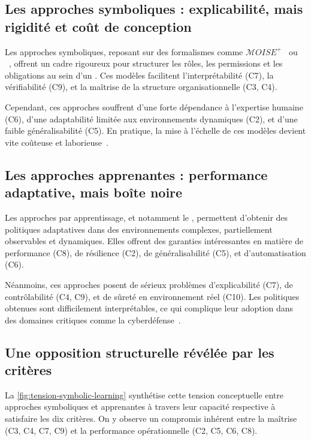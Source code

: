 \subsection{Les approches symboliques : explicabilité, mais rigidité et coût de conception}

Les approches symboliques, reposant sur des formalismes comme $\mathcal{M}OISE^+$~\cite{hubner2002moise} ou ~\cite{Ferber2004}, offrent un cadre rigoureux pour structurer les rôles, les permissions et les obligations au sein d'un . Ces modèles facilitent l'interprétabilité (C7), la vérifiabilité (C9), et la maîtrise de la structure organisationnelle (C3, C4).

Cependant, ces approches souffrent d'une forte dépendance à l'expertise humaine (C6), d'une adaptabilité limitée aux environnements dynamiques (C2), et d'une faible généralisabilité (C5). En pratique, la mise à l'échelle de ces modèles devient vite coûteuse et laborieuse~\cite{Picard2006}.

\subsection{Les approches apprenantes : performance adaptative, mais boîte noire}

Les approches par apprentissage, et notamment le , permettent d'obtenir des politiques adaptatives dans des environnements complexes, partiellement observables et dynamiques. Elles offrent des garanties intéressantes en matière de performance (C8), de résilience (C2), de généralisabilité (C5), et d'automatisation (C6).

Néanmoins, ces approches posent de sérieux problèmes d'explicabilité (C7), de contrôlabilité (C4, C9), et de sûreté en environnement réel (C10). Les politiques obtenues sont difficilement interprétables, ce qui complique leur adoption dans des domaines critiques comme la cyberdéfense~\cite{Gunning2019}.

\subsection{Une opposition structurelle révélée par les critères}

La \autoref{fig:tension-symbolic-learning} synthétise cette tension conceptuelle entre approches symboliques et apprenantes à travers leur capacité respective à satisfaire les dix critères. On y observe un compromis inhérent entre la maîtrise (C3, C4, C7, C9) et la performance opérationnelle (C2, C5, C6, C8).

